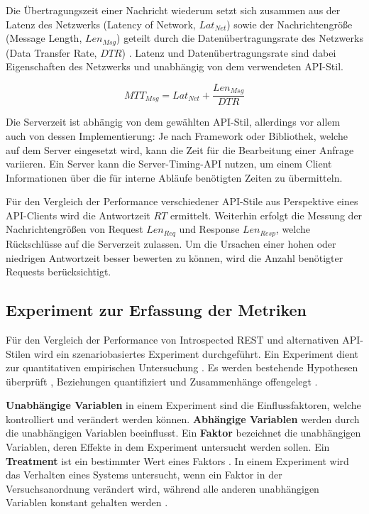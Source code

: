 \noindent{}Die Übertragungszeit einer Nachricht wiederum setzt sich zusammen aus der Latenz des Netzwerks (Latency of Network, \(\mathit{Lat}_{Net}\)) sowie der Nachrichtengröße (Message Length, \(\mathit{Len}_{\mathit{Msg}}\)) geteilt durch die Datenübertragungsrate des Netzwerks (Data Transfer Rate, \(\mathit{DTR}\)) \autocite[S.~83]{Coulouris2012}. Latenz und Datenübertragungsrate sind dabei Eigenschaften des Netzwerks und unabhängig von dem verwendeten API-Stil.

\begin{equation}\label{eqn:comp-criteria|performance|message-transmission-time}
    \mathit{MTT}_{\mathit{Msg}} = \mathit{Lat}_{Net} + \frac{\mathit{Len}_{\mathit{Msg}}}{\mathit{DTR}}
\end{equation}

\noindent{}Die Serverzeit ist abhängig von dem gewählten API-Stil, allerdings vor allem auch von dessen Implementierung: Je nach Framework oder Bibliothek, welche auf dem Server eingesetzt wird, kann die Zeit für die Bearbeitung einer Anfrage variieren. Ein Server kann die Server-Timing-API \autocite{Vazac2020} nutzen, um einem Client Informationen über die für interne Abläufe benötigten Zeiten zu übermitteln.

\para{}Für den Vergleich der Performance verschiedener API-Stile aus Perspektive eines API-Clients wird die Antwortzeit \(RT\) ermittelt. Weiterhin erfolgt die Messung der Nachrichtengrößen von Request \(\mathit{Len}_{\mathit{Req}}\) und Response \(\mathit{Len}_{\mathit{Resp}}\), welche Rückschlüsse auf die Serverzeit zulassen. Um die Ursachen einer hohen oder niedrigen Antwortzeit besser bewerten zu können, wird die Anzahl benötigter Requests berücksichtigt.

\subsection{Experiment zur Erfassung der Metriken}\label{subsec:comp-criteria|performance|experiment}
Für den Vergleich der Performance von Introspected REST und alternativen API-Stilen wird ein szenariobasiertes Experiment durchgeführt. Ein Experiment dient zur quantitativen empirischen Untersuchung \autocite{Hakansson2013}. Es werden bestehende Hypothesen überprüft \autocite[S.~42]{Voss2019}, Beziehungen quantifiziert und Zusammenhänge offengelegt \autocite[S.~9]{Wohlin2012}.

\textbf{Unabhängige Variablen} in einem Experiment sind die Einflussfaktoren, welche kontrolliert und verändert werden können. \textbf{Abhängige Variablen} werden durch die unabhängigen Variablen beeinflusst. Ein \textbf{Faktor} bezeichnet die unabhängigen Variablen, deren Effekte in dem Experiment untersucht werden sollen. Ein \textbf{Treatment} ist ein bestimmter Wert eines Faktors \autocite[S.~74f.]{Wohlin2012}. In einem Experiment wird das Verhalten eines Systems untersucht, wenn ein Faktor in der Versuchsanordnung verändert wird, während alle anderen unabhängigen Variablen konstant gehalten werden \autocite[S.~11]{Wohlin2012}.

